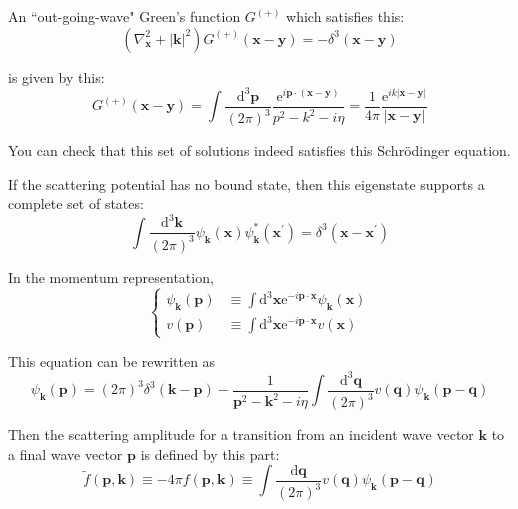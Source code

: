 An ``out-going-wave" Green's function $G^{(+)}$ which satisfies this:
\begin{equation*} \label{Eqs2.7.A.3} \tag{2.7.A.3}
\left( \nabla_{\mathbf{x}}^2 + {|\mathbf{k}|}^2 \right) G^{(+)}(\mathbf{x}-\mathbf{y}) = - \delta^3 (\mathbf{x}-\mathbf{y}) \end{equation*}

is given by this:
\begin{equation*} \label{Eqs2.7.A.4} \tag{2.7.A.4}
G^{(+)}(\mathbf{x}-\mathbf{y}) = \int \frac{\mathrm{d}^3 \mathbf{p}}{(2 \pi)^3} \frac{\mathrm{e}^{i \mathbf{p} \cdot (\mathbf{x}-\mathbf{y})}}{p^2-k^2-i \eta}
= \frac{1}{4 \pi} \frac{\mathrm{e}^{i k |\mathbf{x}-\mathbf{y}|}}{|\mathbf{x}-\mathbf{y}|}
\end{equation*}

You can check that this set of solutions indeed satisfies this Schr\"odinger equation.

If the scattering potential has no bound state, then this eigenstate supports a complete set of states:
\begin{equation*} \label{Eqs2.7.A.5} \tag{2.7.A.5}
\int \frac{\mathrm{d}^3 \mathbf{k}}{(2\pi)^3} \psi_{\mathbf{k}} (\mathbf{x}) \psi_{\mathbf{k}}^* (\mathbf{x}^{'}) = \delta^3 (\mathbf{x}-\mathbf{x}^{'})
\end{equation*}

In the momentum representation,
\begin{equation*} \label{Eqs2.7.A.6} \tag{2.7.A.6}
\left\{ \begin{aligned}
\psi_{\mathbf{k}} (\mathbf{p}) &\equiv \int \mathrm{d}^3 \mathbf{x} \mathrm{e}^{-i \mathbf{p} \cdot \mathbf{x}} \psi_{\mathbf{k}} (\mathbf{x})\\
v(\mathbf{p}) & \equiv \int \mathrm{d}^3 \mathbf{x} \mathrm{e}^{-i \mathbf{p} \cdot \mathbf{x}} v(\mathbf{x})
\end{aligned} \right.
\end{equation*}

This equation can be rewritten as
\begin{equation*} \label{Eqs2.7.A.7} \tag{2.7.A.7}
\psi_{\mathbf{k}}(\mathbf{p}) = (2\pi) ^3 \delta^3(\mathbf{k}-\mathbf{p}) - \frac{1}{\mathbf{p}^2 - \mathbf{k}^2 - i \eta} \int \frac{ \mathrm{d}^3 \mathbf{q}}{(2\pi)^3} v(\mathbf{q}) \psi_{\mathbf{k}}(\mathbf{p}-\mathbf{q})
\end{equation*}

Then the scattering amplitude for a transition from an incident wave vector $\mathbf{k}$ to a final wave vector $\mathbf{p}$ is defined by this part:
\begin{equation*} \label{Eqs2.7.A.8} \tag{2.7.A.8}
\tilde{f}(\mathbf{p},\mathbf{k}) \equiv -4 \pi f(\mathbf{p},\mathbf{k}) \equiv \int \frac{\mathrm{d}\mathbf{q}}{(2\pi)^3} v(\mathbf{q}) \psi_{\mathbf{k}}(\mathbf{p}-\mathbf{q})
\end{equation*}

